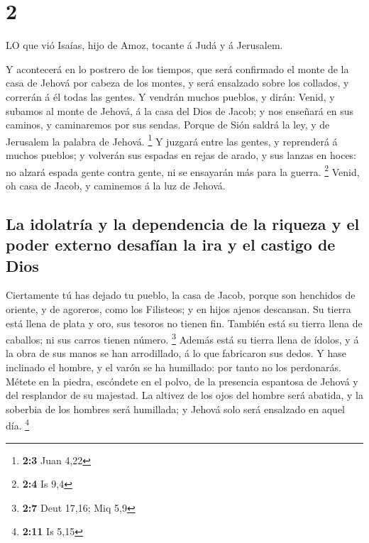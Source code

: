 \hypertarget{section-1}{%
\section{2}\label{section-1}}

 LO que vió Isaías, hijo de Amoz, tocante á Judá y á
Jerusalem.

 Y acontecerá en lo postrero de los tiempos, que será
confirmado el monte de la casa de Jehová por cabeza de los montes, y
será ensalzado sobre los collados, y correrán á él todas las gentes.
 Y vendrán muchos pueblos, y dirán: Venid, y subamos al
monte de Jehová, á la casa del Dios de Jacob; y nos enseñará en sus
caminos, y caminaremos por sus sendas. Porque de Sión saldrá la ley, y
de Jerusalem la palabra de Jehová. \footnote{\textbf{2:3} Juan 4,22}
 Y juzgará entre las gentes, y reprenderá á muchos pueblos;
y volverán sus espadas en rejas de arado, y sus lanzas en hoces: no
alzará espada gente contra gente, ni se ensayarán más para la guerra.
\footnote{\textbf{2:4} Is 9,4}  Venid, oh casa de Jacob, y
caminemos á la luz de Jehová.

\hypertarget{la-idolatruxeda-y-la-dependencia-de-la-riqueza-y-el-poder-externo-desafuxedan-la-ira-y-el-castigo-de-dios}{%
\subsection{La idolatría y la dependencia de la riqueza y el poder
externo desafían la ira y el castigo de
Dios}\label{la-idolatruxeda-y-la-dependencia-de-la-riqueza-y-el-poder-externo-desafuxedan-la-ira-y-el-castigo-de-dios}}

 Ciertamente tú has dejado tu pueblo, la casa de Jacob,
porque son henchidos de oriente, y de agoreros, como los Filisteos; y en
hijos ajenos descansan.  Su tierra está llena de plata y
oro, sus tesoros no tienen fin. También está su tierra llena de
caballos; ni sus carros tienen número. \footnote{\textbf{2:7} Deut
  17,16; Miq 5,9}  Además está su tierra llena de ídolos, y
á la obra de sus manos se han arrodillado, á lo que fabricaron sus
dedos.  Y hase inclinado el hombre, y el varón se ha
humillado: por tanto no los perdonarás.  Métete en la
piedra, escóndete en el polvo, de la presencia espantosa de Jehová y del
resplandor de su majestad.  La altivez de los ojos del
hombre será abatida, y la soberbia de los hombres será humillada; y
Jehová solo será ensalzado en aquel día. \footnote{\textbf{2:11} Is 5,15}

